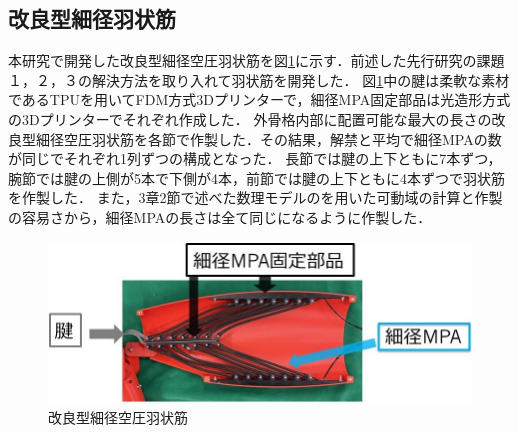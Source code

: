 \subsection{改良型細径羽状筋}
本研究で開発した改良型細径空圧羽状筋を図\ref{fig:ujyoukin_new}に示す．前述した先行研究の課題１，２，３の解決方法を取り入れて羽状筋を開発した．
図\ref{fig:ujyoukin_new}中の腱は柔軟な素材であるTPUを用いてFDM方式3Dプリンターで，細径MPA固定部品は光造形方式の3Dプリンターでそれぞれ作成した．
外骨格内部に配置可能な最大の長さの改良型細径空圧羽状筋を各節で作製した．その結果，解禁と平均で細径MPAの数が同じでそれぞれ1列ずつの構成となった．
長節では腱の上下ともに7本ずつ，腕節では腱の上側が5本で下側が4本，前節では腱の上下ともに4本ずつで羽状筋を作製した．
また，3章2節で述べた数理モデルのを用いた可動域の計算と作製の容易さから，細径MPAの長さは全て同じになるように作製した．
%
\begin{figure}[ht]
  \centering
  \includegraphics[scale=0.7]{image/uyjoukin_new.jpg}
  \caption{改良型細径空圧羽状筋}
  \label{fig:ujyoukin_new}
\end{figure}
%
%

